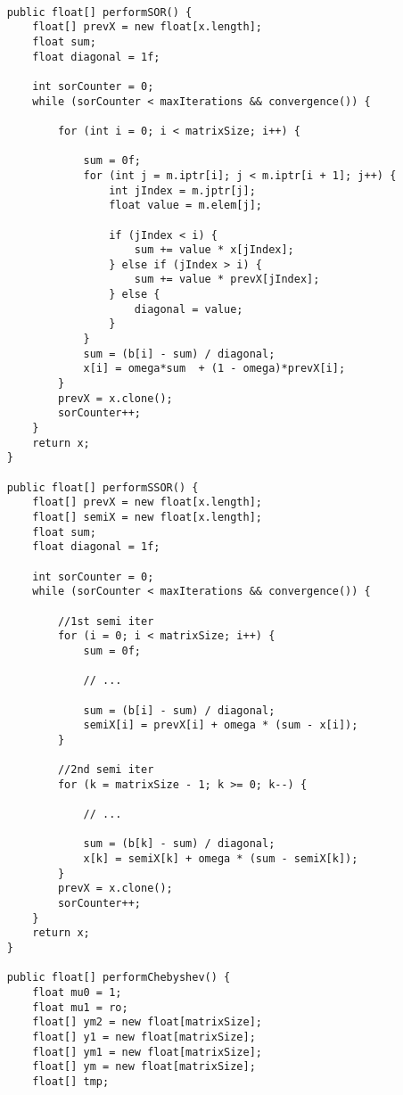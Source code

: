 \documentclass[12pt]{article}
\begin{document}
    {
        \lstset{basicstyle=\tiny}
        \begin{lstlisting}

    public float[] performSOR() {
        float[] prevX = new float[x.length];
        float sum;
        float diagonal = 1f;
        
        int sorCounter = 0;
        while (sorCounter < maxIterations && convergence()) {

            for (int i = 0; i < matrixSize; i++) {

                sum = 0f;
                for (int j = m.iptr[i]; j < m.iptr[i + 1]; j++) {
                    int jIndex = m.jptr[j];
                    float value = m.elem[j];

                    if (jIndex < i) {
                        sum += value * x[jIndex];
                    } else if (jIndex > i) {
                        sum += value * prevX[jIndex];
                    } else {
                        diagonal = value;
                    }
                }
                sum = (b[i] - sum) / diagonal;
                x[i] = omega*sum  + (1 - omega)*prevX[i];
            }
            prevX = x.clone();
            sorCounter++;
        }
        return x;
    }
    
    public float[] performSSOR() {
        float[] prevX = new float[x.length];
        float[] semiX = new float[x.length];
        float sum;
        float diagonal = 1f;
        
        int sorCounter = 0;
        while (sorCounter < maxIterations && convergence()) {

            //1st semi iter
            for (i = 0; i < matrixSize; i++) {
                sum = 0f;
                
                // ...
                
                sum = (b[i] - sum) / diagonal;
                semiX[i] = prevX[i] + omega * (sum - x[i]);
            }

            //2nd semi iter
            for (k = matrixSize - 1; k >= 0; k--) {

                // ...
                
                sum = (b[k] - sum) / diagonal;
                x[k] = semiX[k] + omega * (sum - semiX[k]);
            }
            prevX = x.clone();
            sorCounter++;
        }
        return x;
    }
    
    public float[] performChebyshev() {
        float mu0 = 1;
        float mu1 = ro;
        float[] ym2 = new float[matrixSize];
        float[] y1 = new float[matrixSize];
        float[] ym1 = new float[matrixSize];
        float[] ym = new float[matrixSize];
        float[] tmp;


\end{lstlisting}}
\end{document}
